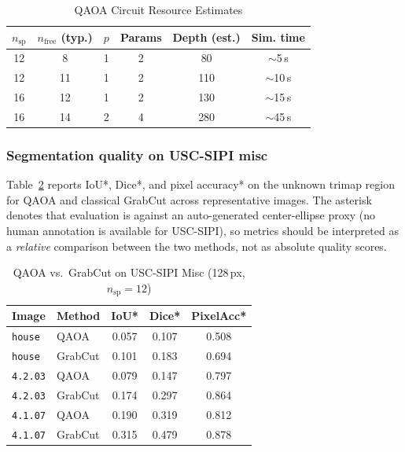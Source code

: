 \documentclass[journal]{IEEEtran}
\begin{document}
\begin{table}[!t]
\renewcommand{\arraystretch}{1.2}
\caption{QAOA Circuit Resource Estimates}
\label{tab:qaoa_resource}
\centering
\begin{tabular}{cccccc}
\toprule
$n_{\text{sp}}$ & $n_{\text{free}}$ (typ.) & $p$ & Params & Depth (est.) & Sim. time \\
\midrule
12 & 8  & 1 & 2 & 80  & $\sim$5\,s  \\
12 & 11 & 1 & 2 & 110 & $\sim$10\,s \\
16 & 12 & 1 & 2 & 130 & $\sim$15\,s \\
16 & 14 & 2 & 4 & 280 & $\sim$45\,s \\
\bottomrule
\end{tabular}
\end{table}

\subsubsection{Segmentation quality on USC-SIPI misc}

Table~\ref{tab:qaoa_seg} reports IoU*, Dice*, and pixel accuracy* on the
unknown trimap region for QAOA and classical GrabCut across representative
images.  The asterisk denotes that evaluation is against an auto-generated
center-ellipse proxy (no human annotation is available for USC-SIPI), so
metrics should be interpreted as a \emph{relative} comparison between the
two methods, not as absolute quality scores.

\begin{table}[!t]
\renewcommand{\arraystretch}{1.2}
\caption{QAOA vs.\ GrabCut on USC-SIPI Misc (128\,px, $n_{\text{sp}}=12$)}
\label{tab:qaoa_seg}
\centering
\begin{tabular}{llccc}
\toprule
Image & Method & IoU* & Dice* & PixelAcc* \\
\midrule
\texttt{house}   & QAOA     & 0.057 & 0.107 & 0.508 \\
\texttt{house}   & GrabCut  & 0.101 & 0.183 & 0.694 \\
\texttt{4.2.03}  & QAOA     & 0.079 & 0.147 & 0.797 \\
\texttt{4.2.03}  & GrabCut  & 0.174 & 0.297 & 0.864 \\
\texttt{4.1.07}  & QAOA     & 0.190 & 0.319 & 0.812 \\
\texttt{4.1.07}  & GrabCut  & 0.315 & 0.479 & 0.878 \\
\bottomrule
\end{tabular}
\end{table}
\end{document}

